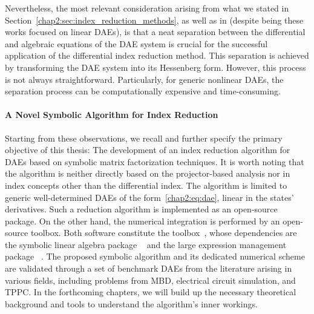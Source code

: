 Nevertheless, the most relevant consideration arising from what we stated in Section~\ref{chap2:sec:index_reduction_methods}, as well as in \citet{bojarincev1980regular, gear1984ode, griepentrog1989basic} (despite being these works focused on linear \acp{DAE}), is that a neat separation between the differential and algebraic equations of the \ac{DAE} system is crucial for the successful application of the differential index reduction method. This separation is achieved by transforming the \ac{DAE} system into its Hessenberg form. However, this process is not always straightforward. Particularly, for generic nonlinear \acp{DAE}, the separation process can be computationally expensive and time-consuming.

\paragraph{A Novel Symbolic Algorithm for Index Reduction}

Starting from these observations, we recall and further specify the primary objective of this thesis: The development of an index reduction algorithm for \acp{DAE} based on symbolic matrix factorization techniques. It is worth noting that the algorithm is neither directly based on the projector-based analysis nor in index concepts other than the differential index. The algorithm is limited to generic well-determined \acp{DAE} of the form~\eqref{chap2:eq:dae}, linear in the states' derivatives. Such a reduction algorithm is implemented as an open-source \Maple{} package. On the other hand, the numerical integration is performed by an open-source \Matlab{} toolbox. Both software constitute the \Indigo{} toolbox~\cite{indigo}, whose dependencies are the symbolic linear algebra package \LAST{}~\cite{last} and the large expression management package \LEM{}~\cite{lem}. The proposed symbolic algorithm and its dedicated numerical scheme are validated through a set of benchmark \acp{DAE} from the literature arising in various fields, including problems from \ac{MBD}, electrical circuit simulation, and \ac{TPPC}. In the forthcoming chapters, we will build up the necessary theoretical background and tools to understand the algorithm's inner workings.

